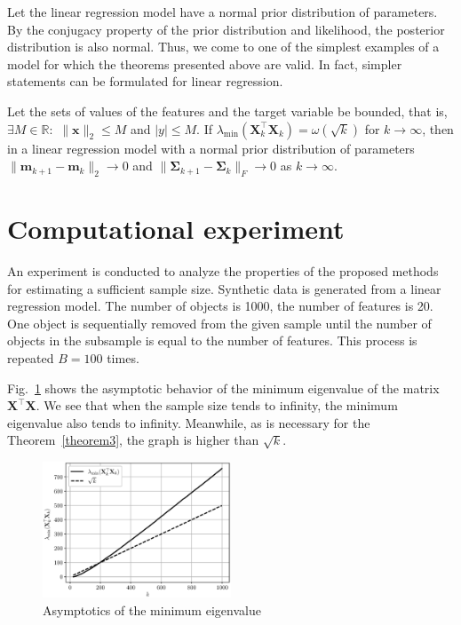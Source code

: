 \documentclass[
11pt,%
tightenlines,%
twoside,%
onecolumn,%
nofloats,%
nobibnotes,%
nofootinbib,%
superscriptaddress,%
noshowpacs,%
centertags]%
{revtex4-2}
\begin{document}
Let the linear regression model have a normal prior distribution of parameters. By the conjugacy property of the prior distribution and likelihood, the posterior distribution is also normal. Thus, we come to one of the simplest examples of a model for which the theorems presented above are valid. In fact, simpler statements can be formulated for linear regression.

\begin{theorem}\label{theorem3}
    Let the sets of values of the features and the target variable be bounded, that is, $\exists M\in \mathbb{R}:$ $\|\mathbf{x}\|_2\leqslant M$ and $|y|\leqslant M$. If $\lambda_{\min}\left(\mathbf{X}^{\top}_k \mathbf{X}_k \right) = \omega(\sqrt{k})$ for $k\to \infty$, then in a linear regression model with a normal prior distribution of parameters $\|\mathbf{m}_{k+1} - \mathbf{m}_k\|_2\to 0$ and $\|\mathbf{\Sigma}_{k+1} - \mathbf{\Sigma}_k\|_{F}\to 0$ as $k\to \infty$.
\end{theorem}

\section{Computational experiment}\label{sec4}

An experiment is conducted to analyze the properties of the proposed methods for estimating a sufficient sample size. Synthetic data is generated from a linear regression model. The number of objects is 1000, the number of features is 20. One object is sequentially removed from the given sample until the number of objects in the subsample is equal to the number of features. This process is repeated $B=100$ times. 

Fig.~\ref{lambda} shows the asymptotic behavior of the minimum eigenvalue of the matrix $\mathbf{X}^\top \mathbf{X}$. We see that when the sample size tends to infinity, the minimum eigenvalue also tends to infinity. Meanwhile, as is necessary for the Theorem~\ref{theorem3}, the graph is higher than $\sqrt{k}$.

\begin{figure}[h!]
    \centering
    \includegraphics[width=0.5\textwidth]{../paper/figures/gray/eps/lambda}
    \caption{Asymptotics of the minimum eigenvalue}
    \label{lambda}
\end{figure}
\end{document}
